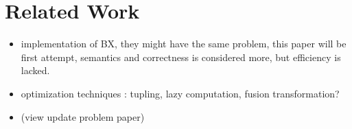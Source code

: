 \section{Related Work}

\begin{itemize}
    \item implementation of BX, they might have the same problem, this paper will be first attempt, semantics and correctness is considered more, but efficiency is  lacked.
    \item optimization techniques : tupling, lazy computation, fusion transformation?
    \item (view update problem paper)
\end{itemize}